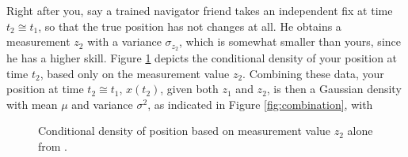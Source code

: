 Right after you, say a trained navigator friend takes an independent fix at time $t_2 \cong t_1$, so that the true position has not changes at all. He obtains a measurement $z_2$ with a variance $\sigma_{z_2}$, which is somewhat smaller than yours, since he has a higher skill. Figure \ref{fig:measurement_z2} depicts the conditional density of your position at time $t_2$, based only on the measurement value $z_2$. Combining these data, your position at time $t_2 \cong t_1$, $x(t_2)$, given both $z_1$ and $z_2$, is then a Gaussian density with mean $\mu$ and variance $\sigma^2$, as indicated in Figure \ref{fig:combination}, with

\begin{figure}
\centering
{}
\caption{Conditional density of position based on measurement value $z_2$ alone from \cite{Maybeck79}.} \label{fig:measurement_z2}
\end{figure}

